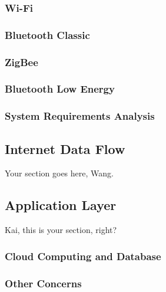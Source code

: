 \documentclass[10pt,journal,final,a4paper,nofonttune]{IEEEtran}
\begin{document}
\subsubsection{Wi-Fi}

\subsubsection{Bluetooth Classic}

\subsubsection{ZigBee}

\subsubsection{Bluetooth Low Energy}

\subsubsection*{System Requirements Analysis}





\subsection{Internet Data Flow}


Your section goes here, Wang.






\subsection{Application Layer}

Kai, this is your section, right? \\

\subsubsection{Cloud Computing and Database}



\subsubsection{Other Concerns}
\end{document}
